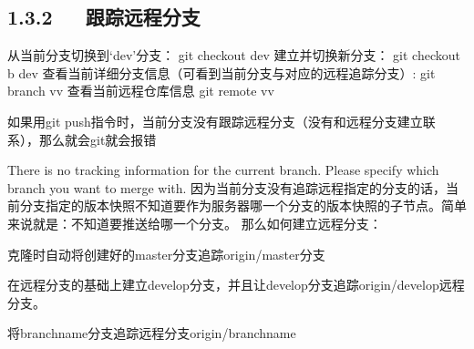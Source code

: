 \documentclass[letterpaper,12pt,english]{sphinxmanual}
\begin{document}
\subsection{1.3.2   跟踪远程分支}
\label{\detokenize{001software/001install/001._u7f51_u7ad9/github:id6}}
\begin{sphinxVerbatim}[commandchars=\\\{\}]
从当前分支切换到‘dev’分支：
git checkout dev
建立并切换新分支：
git checkout \PYGZhy{}b \PYGZsq{}dev\PYGZsq{}
查看当前详细分支信息（可看到当前分支与对应的远程追踪分支）:
git branch \PYGZhy{}vv
查看当前远程仓库信息
git remote \PYGZhy{}vv
\end{sphinxVerbatim}

如果用git push指令时，当前分支没有跟踪远程分支（没有和远程分支建立联系），那么就会git就会报错

There is no tracking information for the current branch.
Please specify which branch you want to merge with.
因为当前分支没有追踪远程指定的分支的话，当前分支指定的版本快照不知道要作为服务器哪一个分支的版本快照的子节点。简单来说就是：不知道要推送给哪一个分支。
那么如何建立远程分支：

克隆时自动将创建好的master分支追踪origin/master分支

\begin{sphinxVerbatim}[commandchars=\\\{\}]
  
    
\end{sphinxVerbatim}

在远程分支的基础上建立develop分支，并且让develop分支追踪origin/develop远程分支。

\begin{sphinxVerbatim}[commandchars=\\\{\}]
    
\end{sphinxVerbatim}

将branch\sphinxhyphen{}name分支追踪远程分支origin/branch\sphinxhyphen{}name

\begin{sphinxVerbatim}[commandchars=\\\{\}]
   
\end{sphinxVerbatim}
\end{document}
